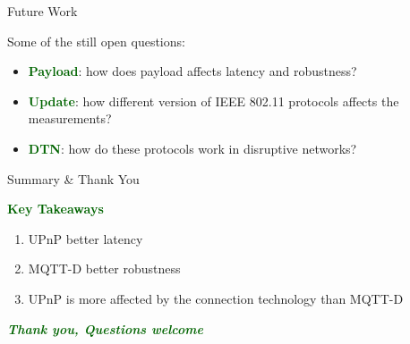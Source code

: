 \documentclass[11pt,xcolor={dvipsnames},usepdftitle=false]{beamer}
\newcommand{\emphasise}[1]{{\textcolor{darkgreen}{\textbf{#1}}}}
\begin{document}
\begin{frame}{Future Work}

    Some of the still open questions:
    
    \begin{itemize}
        \item \emphasise{Payload}: how does payload affects latency and robustness?
        \item \emphasise{Update}: how different version of IEEE 802.11 protocols affects the measurements?
        \item \emphasise{DTN}: how do these protocols work in disruptive networks?
    \end{itemize}
\end{frame}

\begin{frame}{Summary \& Thank You}

    \emphasise{Key Takeaways}
    \begin{enumerate}
        \item UPnP better latency
        \item MQTT-D better robustness
        \item UPnP is more affected by the connection technology than MQTT-D
    \end{enumerate}

    \vspace{2\baselineskip}

    \begin{center}
        \textit{\emphasise{Thank you, Questions welcome}}
    \end{center}
\end{frame}

\lastslide
\end{document}
